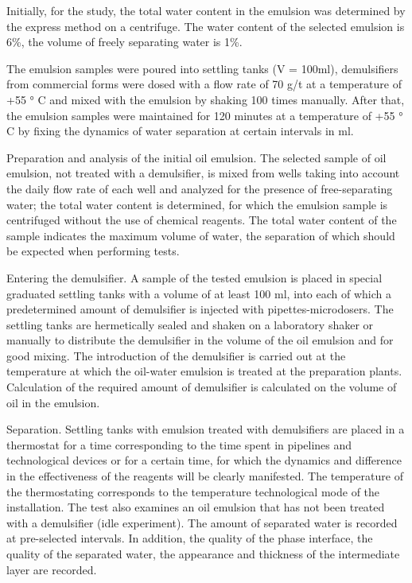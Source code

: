 Initially, for the study, the total water content in the emulsion was
determined by the express method on a centrifuge. The water content of
the selected emulsion is 6\%, the volume of freely separating water is
1\%.

The emulsion samples were poured into settling tanks (V = 100ml),
demulsifiers from commercial forms were dosed with a flow rate of 70 g/t
at a temperature of +55 ° C and mixed with the emulsion by shaking 100
times manually. After that, the emulsion samples were maintained for 120
minutes at a temperature of +55 ° C by fixing the dynamics of water
separation at certain intervals in ml.

Preparation and analysis of the initial oil emulsion. The selected
sample of oil emulsion, not treated with a demulsifier, is mixed from
wells taking into account the daily flow rate of each well and analyzed
for the presence of free-separating water; the total water content is
determined, for which the emulsion sample is centrifuged without the use
of chemical reagents. The total water content of the sample indicates
the maximum volume of water, the separation of which should be expected
when performing tests.

Entering the demulsifier. A sample of the tested emulsion is placed in
special graduated settling tanks with a volume of at least 100 ml, into
each of which a predetermined amount of demulsifier is injected with
pipettes-microdosers. The settling tanks are hermetically sealed and
shaken on a laboratory shaker or manually to distribute the demulsifier
in the volume of the oil emulsion and for good mixing. The introduction
of the demulsifier is carried out at the temperature at which the
oil-water emulsion is treated at the preparation plants. Calculation of
the required amount of demulsifier is calculated on the volume of oil in
the emulsion.

Separation. Settling tanks with emulsion treated with demulsifiers are
placed in a thermostat for a time corresponding to the time spent in
pipelines and technological devices or for a certain time, for which the
dynamics and difference in the effectiveness of the reagents will be
clearly manifested. The temperature of the thermostating corresponds to
the temperature technological mode of the installation. The test also
examines an oil emulsion that has not been treated with a demulsifier
(idle experiment). The amount of separated water is recorded at
pre-selected intervals. In addition, the quality of the phase interface,
the quality of the separated water, the appearance and thickness of the
intermediate layer are recorded.

